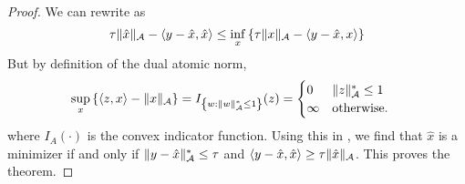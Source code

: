 \begin{proof}
We can rewrite  as
\begin{equation}
\label{eq:reformulate-subgradient}
\tau \lVert\hat{x}\rVert_{\mathcal{A}} - \langle y - \hat{x}, \hat{x}\rangle \leq \inf_x \left\{ \tau \lVert x\rVert_{\mathcal{A}} - \langle y - \hat{x}, x\rangle \right\}
\end{equation}
But by definition of the dual atomic norm, 
\begin{align}
\label{eq:conjugate-norm}
\sup_x \left\{ \langle z, x\rangle - \lVert x\rVert_{\mathcal{A}} \right\} &=  I_{\left\{ w : \lVert w\rVert_{\mathcal{A}}^* \leq 1\right\}}(z)
 = 
\begin{cases}
0 & \lVert z\rVert_{\mathcal{A}}^* \leq 1\\
\infty & \text{otherwise.}
\end{cases}
\end{align}
where $I_A(\cdot)$ is the convex indicator function. Using this in , we find that $\hat{x}$ is a minimizer if and only if $\lVert y - \hat{x}\rVert_{\mathcal{A}}^* \leq \tau$ and $\langle y - \hat{x}, \hat{x}\rangle \geq \tau \lVert\hat{x}\rVert_{\mathcal{A}}$. This proves the theorem.
\end{proof}


